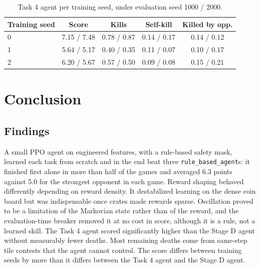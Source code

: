 \documentclass[11pt,a4paper]{report}
\begin{document}
	\begin{table}[htbp]
		\centering
		\small
		\begin{tabular}{lcccc}
			\toprule
			Training seed & Score & Kills & Self-kill & Killed by opp. \\
			\midrule
			0 & 7.15 / 7.48 & 0.78 / 0.87 & 0.14 / 0.17 & 0.14 / 0.12 \\
			1 & 5.64 / 5.17 & 0.40 / 0.35 & 0.11 / 0.07 & 0.10 / 0.17 \\
			2 & 6.20 / 5.67 & 0.57 / 0.50 & 0.09 / 0.08 & 0.15 / 0.21 \\
			\bottomrule
		\end{tabular}
		\caption{Task 4 agent per training seed, under evaluation seed 1000 / 2000.}
		\label{tab:rhine_task4_seeds}
	\end{table}
	
	
	\chapter{Conclusion}
	\label{chap:conclusion}
	\label{sec:rhine_conclusion}
	
	\section{Findings} A small PPO agent on engineered features, with a rule-based safety mask, learned each task from scratch and in the end beat three \texttt{rule\_based\_agent}s: it finished first alone in more than half of the games and averaged 6.3 points against 5.0 for the strongest opponent in each game. Reward shaping behaved differently depending on reward density. It destabilized learning on the dense coin board but was indispensable once crates made rewards sparse. Oscillation proved to be a limitation of the Markovian state rather than of the reward, and the evaluation-time breaker removed it at no cost in score, although it is a rule, not a learned skill. The Task 4 agent scored significantly higher than the Stage D agent without measurably fewer deaths. Most remaining deaths come from same-step tile contests that the agent cannot control. The score differs between training seeds by more than it differs between the Task 4 agent and the Stage D agent.
	
\end{document}
